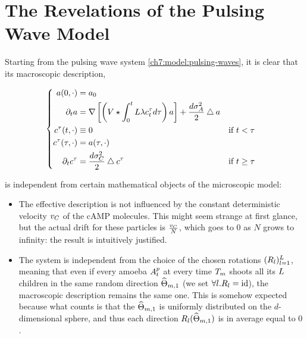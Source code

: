 \label{ch:conc}

\section{The Revelations of the Pulsing Wave Model}

Starting from the pulsing wave system \ref{ch7:model:pulsing-waves}, it is clear that its macroscopic description, \ie

\begin{equation*}
	\left\{
	\begin{aligned}
		a(0, \cdot) &= a_0
		\\
		\partial_t a &= \nabla \left[ \left( V
		\star \int_0^t L\lambda c_t^\tau 	d \tau
		\right)
		a
		\right]
		+ \frac{d\sigma_A^2}{2} \bigtriangleup a	
		\\
		c^\tau(t, \cdot) 
		& \equiv 0
		&&\text{if } t < \tau
		\\
		c^\tau(\tau, \cdot) 
		&= a(\tau, \cdot)
		&&
		\\
		\partial_t c^\tau
		&= \frac{d\sigma_C^2}{2} \bigtriangleup c^\tau
		&&\text{if } t \geq \tau
	\end{aligned}
	\right.
\end{equation*}

is independent from certain mathematical objects of the microscopic model:

\begin{itemize}
	\item The effective description is not influenced by the constant deterministic velocity $v_C$ of the cAMP molecules.
	This might seem strange at first glance, but the actual drift for these particles is $\frac{v_C}{N}$, which goes to $0$ as $N$ grows to infinity: the result is intuitively justified.
	\item The system is independent from the choice of the chosen rotations $(R_l)_{l=1}^L$, meaning that even if every amoeba $A_t^p$ at every time $T_m$ shoots all its $L$ children in the same random direction $\widehat{\Theta}_{m,1}$ (\ie we set $\forall l. R_l = \text{id}$), the macroscopic description remains the same one.
	This is somehow expected because what counts is that the \rv $\widehat{\Theta}_{m,1}$ is uniformly distributed on the $d$-dimensional sphere, and thus each direction $R_l(\widehat{\Theta}_{m,1})$ is in average equal to $0$.
\end{itemize}


